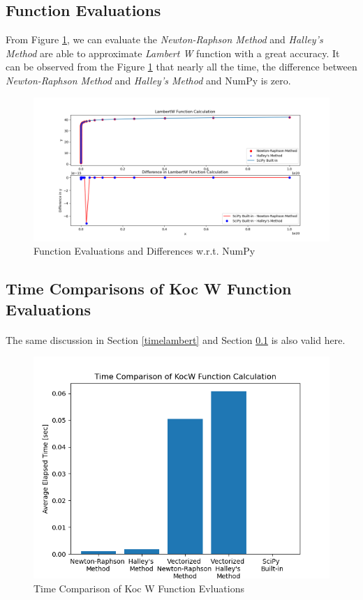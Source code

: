 \documentclass[letterpaper,12pt]{article}
\begin{document}
\subsection{Function Evaluations}
\label{funclambert}
   From Figure \ref{fig:lambertfunceval}, we can evaluate the \textit{Newton-Raphson Method} and \textit{Halley's Method} are able to approximate \textit{Lambert W} function with a great accuracy. It can be observed from the Figure \ref{fig:lambertfunceval} that nearly all the time, the difference between \textit{Newton-Raphson Method} and \textit{Halley's Method} and NumPy is zero.
   
\begin{figure}[H] 
   \centering \includegraphics[width=\columnwidth]{figures/lambertwfunceval.png}           
                  \caption{Function Evaluations and Differences w.r.t. NumPy}                
                     \label{fig:lambertfunceval}
   \end{figure}
\pagebreak

\subsection{Time Comparisons of Koc W Function Evaluations}
\paragraph{}The same discussion in Section \ref{timelambert} and Section \ref{funclambert} is also valid here.
\begin{figure}[H] 
   \centering \includegraphics[width=0.5\columnwidth]{figures/kocwtime.png}           
                  \caption{Time Comparison of Koc W Function Evluations}                
                     \label{fig:koctime}
   \end{figure}
\end{document}
